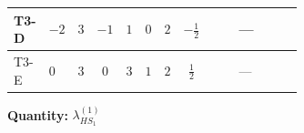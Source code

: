 \documentclass[8pt]{article}
\begin{document}
\begin{landscape}
\begin{longtable}{@{}llcccccc >{\raggedright\arraybackslash}p{0.21\linewidth} >{\raggedright\arraybackslash}p{0.21\linewidth} >{\raggedright\arraybackslash}p{0.21\linewidth}@{}}
\midrule
T3-D & $-2$ & $3$ & $-1$ & $1$ & $0$ & $2$ & $-\frac{1}{2}$ & \scriptsize\adjustbox{max width=\linewidth}{$\begin{gathered} +8 {\lambda_{HS_1}^{(1)}} {\lambda_{S_1}^{(1)}}\end{gathered}$} & --- & \scriptsize\adjustbox{max width=\linewidth}{$\begin{gathered} -\frac{33 {g_2}^2 {\lambda_{HS_1}^{(1)}}}{2}\end{gathered}$} \\
\midrule
T3-E & $0$ & $3$ & $0$ & $3$ & $1$ & $2$ & $\frac{1}{2}$ & \scriptsize\adjustbox{max width=\linewidth}{$\begin{gathered} +8 {\lambda_{HS_1}^{(1)}} {\lambda_{S_1}^{(1)}}\end{gathered}$} & --- & \scriptsize\adjustbox{max width=\linewidth}{$\begin{gathered} -\frac{33 {g_2}^2 {\lambda_{HS_1}^{(1)}}}{2}\end{gathered}$} \\
\midrule
\bottomrule
\end{longtable}
\clearpage
\noindent\textbf{Quantity: }$\lambda_{HS_1}^{(1)}$\par\smallskip

\end{landscape}
\end{document}
